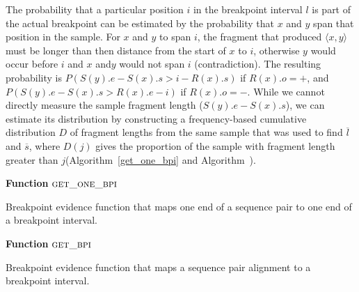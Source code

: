 \documentclass[11pt]{article}
\begin{document}
The probability that a particular position $i$ in the breakpoint interval $l$ is
part of the actual breakpoint can be estimated by the probability that $x$ and
$y$ span that position in the sample. For $x$ and $y$ to span $i$, the fragment
that produced $\langle x,y \rangle$ must be longer than then distance from the
start of $x$ to $i$, otherwise $y$ would occur before $i$ and $x$ and$y$ would
not span $i$ (contradiction).  The resulting probability is 
$P(S(y).e - S(x).s > i - R(x).s)$ if $R(x).o=+$, and 
$P(S(y).e - S(x).s > R(x).e - i)$ if $R(x).o=-$.
While we cannot directly measure the sample fragment length ($S(y).e - S(x).s$),
we can estimate its distribution by constructing a frequency-based cumulative
distribution $D$ of fragment lengths from the same sample that was used to find
$\overline{l}$ and $\overline{s}$, where $D(j)$ gives the proportion of the
sample with fragment length greater than $j$(Algorithm~\ref{get_one_bpi} and
Algorithm~\label{get_bpi}).

\begin{algorithm}[H]
    \DontPrintSemicolon
    \footnotesize
    \BlankLine
    \textbf{Function} $\textsc{get\_one\_bpi}$\;
	\caption{Breakpoint evidence function that maps one end of a sequence pair
			to one end of a breakpoint interval.}
    \label{get_one_bpi}
\end{algorithm}

\begin{algorithm}[H]
    \DontPrintSemicolon
    \footnotesize
    \BlankLine
    \textbf{Function} $\textsc{get\_bpi}$\;
	\caption{Breakpoint evidence function that maps a sequence pair alignment to
			a breakpoint interval.}
    \label{get_bpi}
\end{algorithm}
\end{document}
